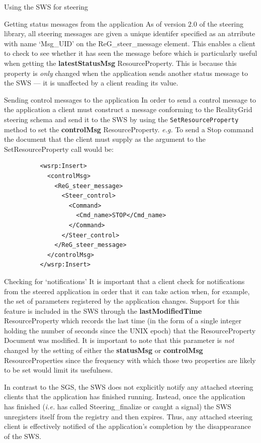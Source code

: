 \documentclass[a4paper]{article}
\begin{document}
\begin{section}{Using the SWS for steering}
\begin{subsection}{Getting status messages from the application}
As of version $2.0$ of the steering library, all steering messages are
given a unique identifer specified as an atrribute with name `Msg\_UID' on
the ReG\_steer\_message element.  This enables a client to check to see
whether it has seen the message before which is particularly useful
when getting the  {\bf latestStatusMsg} ResourceProperty.  This is because
this property is {\em only} changed when the application sends another
status message to the SWS --- it is unaffected by a client reading its
value.
\end{subsection}

\begin{subsection}{Sending control messages to the application}
In order to send a control message to the application a client must
construct a message conforming to the RealityGrid steering schema and
send it to the SWS by using the \texttt{SetResourceProperty} method to
set the {\bf controlMsg} ResourceProperty. {\it e.g.} To send a Stop
command the document that the client must supply as the argument to
the SetResourceProperty call would be:
\begin{verbatim}
          <wsrp:Insert>
            <controlMsg>
              <ReG_steer_message>
                <Steer_control>
                  <Command>
                    <Cmd_name>STOP</Cmd_name>
                  </Command>
                </Steer_control>
              </ReG_steer_message>
            </controlMsg>
          </wsrp:Insert>
\end{verbatim}
\end{subsection}

\begin{subsection}{Checking for `notifications'}
\label{sec:notification}
It is important that a client check for notifications from the steered
application in order that it can take action when, for example, the
set of parameters registered by the application changes.  Support for
this feature is included in the SWS through the {\bf lastModifiedTime}
ResourceProperty which records the last time (in the form of a single
integer holding the number of seconds since the UNIX epoch) that the
ResourceProperty Document was modified.  It is important to note that
this parameter is {\em not} changed by the setting of either the {\bf
statusMsg} or {\bf controlMsg} ResourceProperties since the frequency
with which those two properties are likely to be set would limit its
usefulness.

In contrast to the SGS, the SWS does not explicitly notify any
attached steering clients that the application has finished running.
Instead, once the application has finished ({\it i.e.} has called
Steering\_finalize or caught a signal) the SWS unregisters itself from
the registry and then expires.  Thus, any attached steering client is
effectively notified of the application's completion by the
disappearance of the SWS.
\end{subsection}


\end{section}
\end{document}
